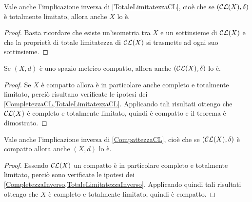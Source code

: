 \begin{remark}\label{TotaleLimitatezzaInverso}
	Vale anche l'implicazione inversa di \cref{TotaleLimitatezzaCL}, cioè che se  $(\mathcal{CL}(X),\delta)$ è totalmente limitato, allora anche $X$ lo è.
\end{remark}
\begin{proof}
	Basta ricordare che esiste un'isometria tra $X$ e un sottinsieme di $\mathcal{CL}(X)$ e che la proprietà di totale limitatezza di $\mathcal{CL}(X)$ si trasmette ad ogni suo sottinsieme.
\end{proof}



\begin{theorem} \label{CompattezzaCL}
	Se $(X,d)$ è uno spazio metrico compatto, allora anche $(\mathcal{CL}(X),\delta)$ lo è.
\end{theorem}
\begin{proof}
	Se $X$ è compatto allora è in particolare anche completo e totalmente limitato, perciò risultano verificate le ipotesi dei \cref{CompletezzaCL,TotaleLimitatezzaCL}. Applicando tali risultati ottengo che $\mathcal{CL}(X)$ è completo e totalmente limitato, quindi è compatto e il teorema è dimostrato.
\end{proof}

\begin{remark} \label{CompattezzaInverso}
	Vale anche l'implicazione inversa di \cref{CompattezzaCL}, cioè che se  $(\mathcal{CL}(X),\delta)$ è compatto allora anche $(X,d)$ lo è.
\end{remark}
\begin{proof}
	Essendo $\mathcal{CL}(X)$ un compatto è in particolare completo e totalmente limitato, perciò sono verificate le ipotesi dei \cref{CompletezzaInverso,TotaleLimitatezzaInverso}. Applicando quindi tali risultati ottengo che $X$ è completo e totalmente limitato, quindi è compatto.
\end{proof}

